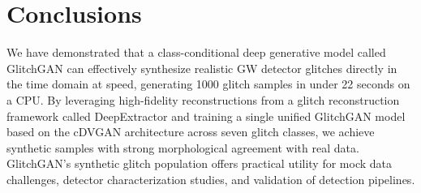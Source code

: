 \documentclass[reprint,nofootinbib,amsmath,amssymb,aps,floatfix]{revtex4-2}
\begin{document}





\section{Conclusions}

We have demonstrated that a class-conditional deep generative model called GlitchGAN can effectively synthesize realistic GW detector glitches directly in the time domain at speed, generating 1000 glitch samples in under 22 seconds on a CPU.
By leveraging high-fidelity reconstructions from a glitch reconstruction framework called DeepExtractor and training a single unified GlitchGAN model based on the cDVGAN architecture across seven glitch classes, we achieve synthetic samples with strong morphological agreement with real data.
GlitchGAN's synthetic glitch population offers practical utility for mock data challenges, detector characterization studies, and validation of detection pipelines.
\end{document}
